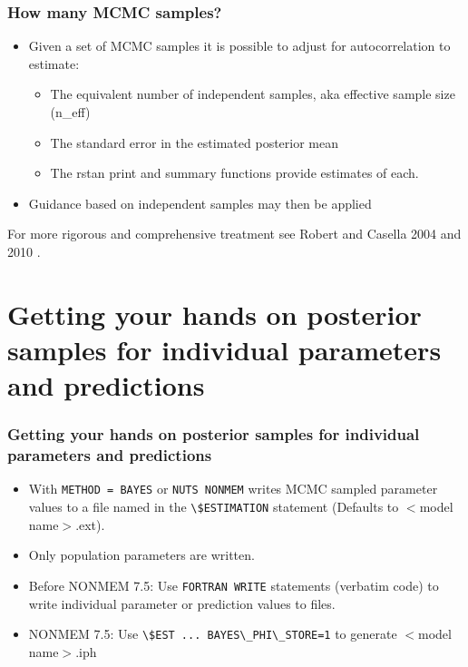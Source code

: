 \documentclass[handout]{beamer}
\begin{document}
\begin{frame}
  \frametitle{How many MCMC samples?}
  
\begin{itemize}
\item Given a set of MCMC samples it is possible to adjust for autocorrelation to estimate:
\begin{itemize}
\item The equivalent number of independent samples, aka effective
  sample size (n\_eff)
\item The standard error in the estimated posterior mean
\item The rstan print and summary functions provide estimates of each.
\end{itemize}
\item Guidance based on independent samples may then be applied
\end{itemize}
For more rigorous and comprehensive treatment see Robert and
  Casella 2004  and 2010 \cite{robertAndCasella2004,robertAndCasella2010}.

\end{frame}

\section[Getting posterior samples for individual parameters]{Getting
  your hands on posterior samples for individual parameters and
  predictions}

\begin{frame}[fragile]
  \frametitle{Getting your hands on posterior samples for individual
    parameters and predictions}

  \begin{itemize}
  \item With \verb|METHOD = BAYES| or \verb|NUTS NONMEM| writes MCMC sampled
    parameter values to a file named in the \verb|\$ESTIMATION| statement
    (Defaults to $<$model name$>$.ext).
  \item Only population parameters are written.
  \item Before NONMEM 7.5: Use \verb|FORTRAN WRITE| statements (verbatim code) to write
    individual parameter or prediction values to files.
  \item NONMEM 7.5: Use \verb|\$EST ... BAYES\_PHI\_STORE=1| to generate $<$model name$>$.iph
  \end{itemize}
  
\end{frame}
\end{document}
